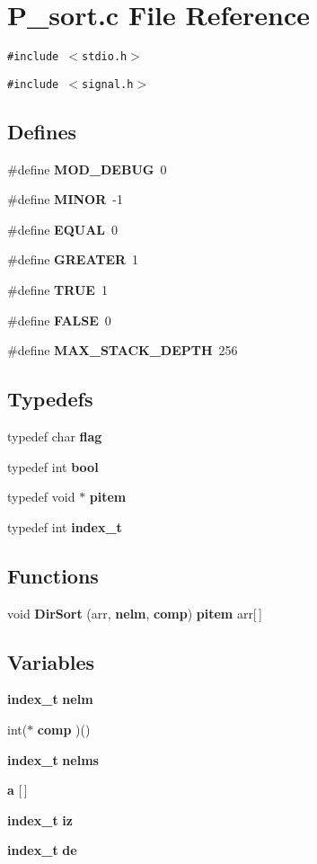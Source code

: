 \section{P\_\-sort.c File Reference}
\label{P__sort_8c}
{\tt \#include $<$stdio.h$>$}\par
{\tt \#include $<$signal.h$>$}\par
\subsection*{Defines}
\begin{CompactItemize}
\item 
\#define {\bf MOD\_\-DEBUG}\ 0
\item 
\#define {\bf MINOR}\ -1
\item 
\#define {\bf EQUAL}\ 0
\item 
\#define {\bf GREATER}\ 1
\item 
\#define {\bf TRUE}\ 1
\item 
\#define {\bf FALSE}\ 0
\item 
\#define {\bf MAX\_\-STACK\_\-DEPTH}\ 256
\end{CompactItemize}
\subsection*{Typedefs}
\begin{CompactItemize}
\item 
typedef char {\bf flag}
\item 
typedef int {\bf bool}
\item 
typedef void $\ast$ {\bf pitem}
\item 
typedef int {\bf index\_\-t}
\end{CompactItemize}
\subsection*{Functions}
\begin{CompactItemize}
\item 
void {\bf Dir\-Sort} (arr, {\bf nelm}, {\bf comp}) {\bf pitem} arr[$\,$]
\end{CompactItemize}
\subsection*{Variables}
\begin{CompactItemize}
\item 
{\bf index\_\-t} {\bf nelm}
\item 
int($\ast$ {\bf comp} )()
\item 
{\bf index\_\-t} {\bf nelms}
\item 
{\bf a} [$\,$]
\item 
{\bf index\_\-t} {\bf iz}
\item 
{\bf index\_\-t} {\bf de}
\end{CompactItemize}


